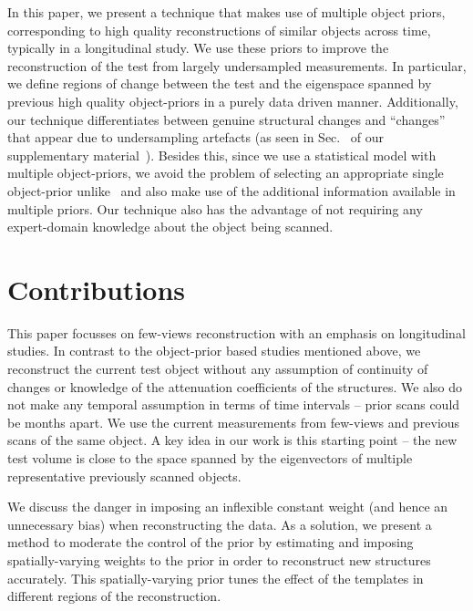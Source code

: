 \documentclass[journal]{IEEEtran}
\begin{document}
In this paper, we present a technique that makes use of multiple
object priors, corresponding to high quality reconstructions of
similar objects across time, typically in a longitudinal study.  We
use these priors to improve the reconstruction of the test from
largely undersampled measurements. In particular, we define regions of
change between the test and the eigenspace spanned by previous high
quality object-priors in a purely data driven manner. Additionally,
our technique differentiates between genuine structural changes and
``changes'' that appear due to undersampling artefacts (as seen in
Sec.~\4 of our supplementary material~\cite{supp_paper}).  Besides this,
since we use a statistical model with multiple object-priors, we avoid
the problem of selecting an appropriate single object-prior
unlike~\cite{PICCS,Pourmorteza2015,Lee2012,pirple,Marjolein2016} and
also make use of the additional information available in multiple
priors. Our technique also has the advantage of not requiring any
expert-domain knowledge about the object being scanned.
 

\section{Contributions}
\label{sec:contributions}
This paper focusses on few-views reconstruction with an emphasis on
longitudinal studies. In contrast to the object-prior based studies
mentioned above, we reconstruct the current test object without any
assumption of continuity of changes or knowledge of the attenuation
coefficients of the structures. We also do not make any temporal
assumption in terms of time intervals -- prior scans could be months
apart. We use the current measurements from few-views and previous
scans of the same object. A key idea in our work is this starting
point -- the new test volume is close to the space spanned by the
eigenvectors of multiple representative previously scanned objects.


We discuss the danger in imposing an inflexible
constant weight (and hence an unnecessary bias) when reconstructing
the data. As a solution, we present a method to moderate the control
of the prior by estimating and imposing spatially-varying weights to
the prior in order to reconstruct new structures accurately. This
spatially-varying prior tunes the effect of the templates in different
regions of the reconstruction.
\end{document}
